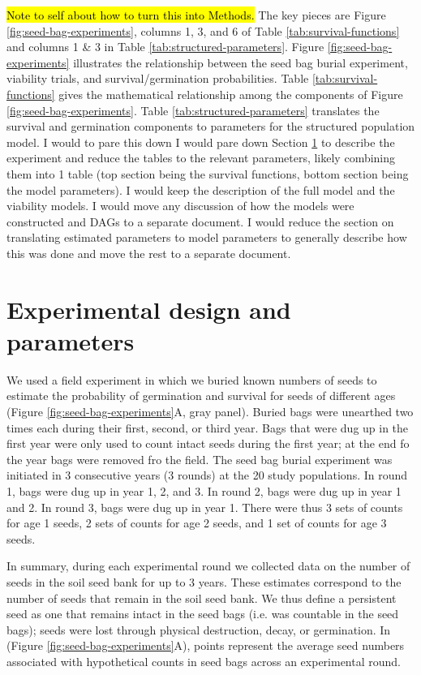 \documentclass[12pt, oneside, titlepage]{article}   	%
\begin{document}
\hl{Note to self about how to turn this into Methods.} The key pieces are Figure \ref{fig:seed-bag-experiments}, columns 1, 3, and 6 of Table \ref{tab:survival-functions} and columns 1 \& 3 in Table \ref{tab:structured-parameters}. Figure \ref{fig:seed-bag-experiments} illustrates the relationship between the seed bag burial experiment, viability trials, and survival/germination probabilities. Table \ref{tab:survival-functions} gives the mathematical relationship among the components of Figure \ref{fig:seed-bag-experiments}. Table \ref{tab:structured-parameters} translates the survival and germination components to parameters for the structured population model. I would to pare this down I would pare down Section \ref{section-1} to describe the experiment and reduce the tables to the relevant parameters, likely combining them into 1 table (top section being the survival functions, bottom section being the model parameters). I would keep the description of the full model and the viability models. I would move any discussion of how the models were constructed and DAGs to a separate document. I would reduce the section on translating estimated parameters to model parameters to generally describe how this was done and move the rest to a separate document. 

\section{Experimental design and parameters}\label{section-1}

We used a field experiment in which we buried known numbers of seeds to estimate the probability of germination and survival for seeds of different ages (Figure \ref{fig:seed-bag-experiments}A, gray panel). Buried bags were unearthed two times each during their first, second, or third year. Bags that were dug up in the first year were only used to count intact seeds during the first year; at the end fo the year bags were removed fro the field. The seed bag burial experiment was initiated in 3 consecutive years (3 rounds) at the 20 study populations. In round 1, bags were dug up in year 1, 2, and 3. In round 2, bags were dug up in year 1 and 2. In round 3, bags were dug up in year 1. There were thus 3 sets of counts for age 1 seeds, 2 sets of counts for age 2 seeds, and 1 set of counts for age 3 seeds. 

In summary, during each experimental round we collected data on the number of seeds in the soil seed bank for up to 3 years. These estimates correspond to the number of seeds that remain in the soil seed bank. We thus define a persistent seed as one that remains intact in the seed bags (i.e. was countable in the seed bags); seeds were lost through physical destruction, decay, or germination. In (Figure \ref{fig:seed-bag-experiments}A), points represent the average seed numbers associated with hypothetical counts in seed bags across an experimental round.
\end{document}
